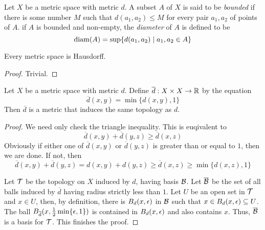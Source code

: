 \begin{definition}
    Let $X$ be a metric space with metric $d$. A subset $A$ of $X$ is said to be \textit{bounded} if there is some number $M$ such that $d(a_1,a_2)\le M$ for every pair $a_1,a_2$ of points of $A$. if $A$ is bounded and non-empty, the \textit{diameter} of $A$ is defined to be 
    \begin{equation*}
        \operatorname{diam}(A) = \sup\{d(a_1,a_2)\mid a_1,a_2\in A\}
    \end{equation*}
\end{definition}

\begin{proposition}
    Every metric space is Hausdorff.
\end{proposition}
\begin{proof}
    Trivial.
\end{proof}

\begin{theorem}
    Let $X$ be a metric space with metric $d$. Define $\overline{d}:X\times X\to\mathbb{R}$ by the equation 
    \begin{equation*}
        \overline{d}(x,y) = \min\{d(x,y), 1\}
    \end{equation*}
    Then $\overline{d}$ is a metric that induces the same topology as $d$.
\end{theorem}
\begin{proof}
    We need only check the triangle inequality. This is euqivalent to 
    \begin{equation*}
        \overline{d}(x,y) + \overline{d}(y,z)\ge \overline{d}(x,z)
    \end{equation*}
    Obviously if either one of $\overline{d}(x,y)$ or $\overline{d}(y,z)$ is greater than or equal to $1$, then we are done. If not, then 
    \begin{equation*}
        \overline{d}(x,y) + \overline{d}(y,z) = d(x,y) + d(y,z)\ge\overline{d}(x,z)\ge\min\{d(x,z), 1\}
    \end{equation*}

    Let $\mathcal{T}$ be the topology on $X$ induced by $d$, having basis $\mathcal{B}$. Let $\overline{\mathcal{B}}$ be the set of all balls induced by $\overline{d}$ having radius strictly less than $1$. Let $U$ be an open set in $\mathcal{T}$ and $x\in U$, then, by definition, there is $B_d(x,\epsilon)$ in $\mathcal{B}$ such that $x\in B_d(x,\epsilon)\subseteq U$. The ball $B_{\overline{d}}(x,\frac{1}{2}\min\{\epsilon, 1\})$ is contained in $B_d(x,\epsilon)$ and also contains $x$. Thus, $\overline{\mathcal{B}}$ is a basis for $\mathcal{T}$. This finishes the proof.
\end{proof}

